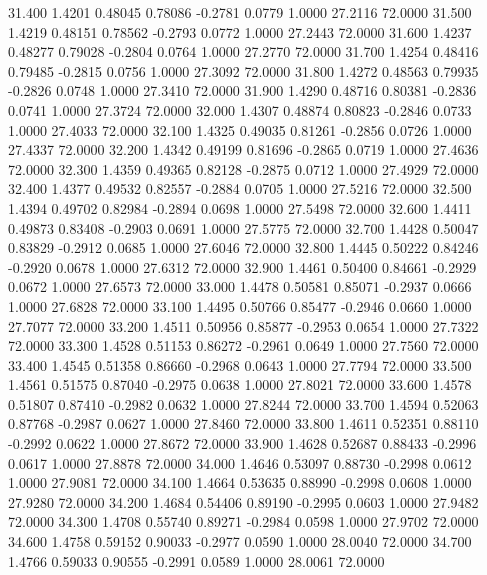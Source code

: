   31.400   1.4201   0.48045   0.78086  -0.2781   0.0779   1.0000  27.2116  72.0000
  31.500   1.4219   0.48151   0.78562  -0.2793   0.0772   1.0000  27.2443  72.0000
  31.600   1.4237   0.48277   0.79028  -0.2804   0.0764   1.0000  27.2770  72.0000
  31.700   1.4254   0.48416   0.79485  -0.2815   0.0756   1.0000  27.3092  72.0000
  31.800   1.4272   0.48563   0.79935  -0.2826   0.0748   1.0000  27.3410  72.0000
  31.900   1.4290   0.48716   0.80381  -0.2836   0.0741   1.0000  27.3724  72.0000
  32.000   1.4307   0.48874   0.80823  -0.2846   0.0733   1.0000  27.4033  72.0000
  32.100   1.4325   0.49035   0.81261  -0.2856   0.0726   1.0000  27.4337  72.0000
  32.200   1.4342   0.49199   0.81696  -0.2865   0.0719   1.0000  27.4636  72.0000
  32.300   1.4359   0.49365   0.82128  -0.2875   0.0712   1.0000  27.4929  72.0000
  32.400   1.4377   0.49532   0.82557  -0.2884   0.0705   1.0000  27.5216  72.0000
  32.500   1.4394   0.49702   0.82984  -0.2894   0.0698   1.0000  27.5498  72.0000
  32.600   1.4411   0.49873   0.83408  -0.2903   0.0691   1.0000  27.5775  72.0000
  32.700   1.4428   0.50047   0.83829  -0.2912   0.0685   1.0000  27.6046  72.0000
  32.800   1.4445   0.50222   0.84246  -0.2920   0.0678   1.0000  27.6312  72.0000
  32.900   1.4461   0.50400   0.84661  -0.2929   0.0672   1.0000  27.6573  72.0000
  33.000   1.4478   0.50581   0.85071  -0.2937   0.0666   1.0000  27.6828  72.0000
  33.100   1.4495   0.50766   0.85477  -0.2946   0.0660   1.0000  27.7077  72.0000
  33.200   1.4511   0.50956   0.85877  -0.2953   0.0654   1.0000  27.7322  72.0000
  33.300   1.4528   0.51153   0.86272  -0.2961   0.0649   1.0000  27.7560  72.0000
  33.400   1.4545   0.51358   0.86660  -0.2968   0.0643   1.0000  27.7794  72.0000
  33.500   1.4561   0.51575   0.87040  -0.2975   0.0638   1.0000  27.8021  72.0000
  33.600   1.4578   0.51807   0.87410  -0.2982   0.0632   1.0000  27.8244  72.0000
  33.700   1.4594   0.52063   0.87768  -0.2987   0.0627   1.0000  27.8460  72.0000
  33.800   1.4611   0.52351   0.88110  -0.2992   0.0622   1.0000  27.8672  72.0000
  33.900   1.4628   0.52687   0.88433  -0.2996   0.0617   1.0000  27.8878  72.0000
  34.000   1.4646   0.53097   0.88730  -0.2998   0.0612   1.0000  27.9081  72.0000
  34.100   1.4664   0.53635   0.88990  -0.2998   0.0608   1.0000  27.9280  72.0000
  34.200   1.4684   0.54406   0.89190  -0.2995   0.0603   1.0000  27.9482  72.0000
  34.300   1.4708   0.55740   0.89271  -0.2984   0.0598   1.0000  27.9702  72.0000
  34.600   1.4758   0.59152   0.90033  -0.2977   0.0590   1.0000  28.0040  72.0000
  34.700   1.4766   0.59033   0.90555  -0.2991   0.0589   1.0000  28.0061  72.0000
